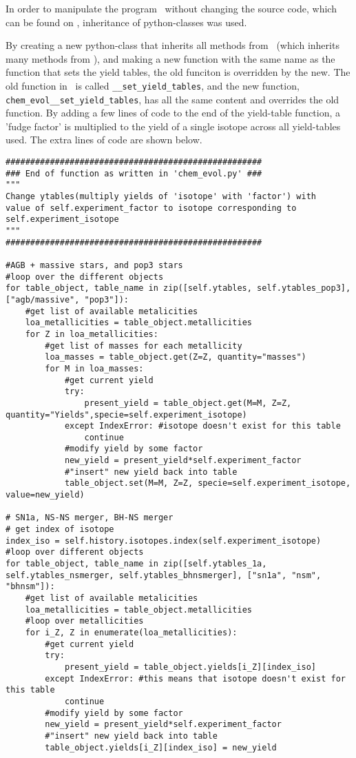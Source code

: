
In order to manipulate the program \omegamodel\ without changing the source code, which can be found on , inheritance of python-classes was used.

By creating a new python-class that inherits all methods from \omegamodel\ (which inherits many methods from \chemevol ), and making a new function with the same name as the function that sets the yield tables, the old funciton is overridden by the new.
The old function in \chemevol\ is called \verb|__set_yield_tables|, and the new function, \verb|chem_evol__set_yield_tables|, has all the same content and overrides the old function. By adding a few lines of code to the end of the yield-table function, a 'fudge factor' is multiplied to the yield of a single isotope across all yield-tables used.
The extra lines of code are shown below.

\begin{lstlisting}[style=custompython, caption={Some caption}]
####################################################
### End of function as written in 'chem_evol.py' ###
""" 
Change ytables(multiply yields of 'isotope' with 'factor') with
value of self.experiment_factor to isotope corresponding to self.experiment_isotope
"""
####################################################

#AGB + massive stars, and pop3 stars
#loop over the different objects
for table_object, table_name in zip([self.ytables, self.ytables_pop3], ["agb/massive", "pop3"]):
    #get list of available metalicities
    loa_metallicities = table_object.metallicities
    for Z in loa_metallicities:
        #get list of masses for each metallicity
        loa_masses = table_object.get(Z=Z, quantity="masses")
        for M in loa_masses:
            #get current yield
            try:
                present_yield = table_object.get(M=M, Z=Z, quantity="Yields",specie=self.experiment_isotope)
            except IndexError: #isotope doesn't exist for this table
                continue
            #modify yield by some factor
            new_yield = present_yield*self.experiment_factor
            #"insert" new yield back into table
            table_object.set(M=M, Z=Z, specie=self.experiment_isotope, value=new_yield)

# SN1a, NS-NS merger, BH-NS merger
# get index of isotope
index_iso = self.history.isotopes.index(self.experiment_isotope)
#loop over different objects
for table_object, table_name in zip([self.ytables_1a, self.ytables_nsmerger, self.ytables_bhnsmerger], ["sn1a", "nsm", "bhnsm"]):
    #get list of available metalicities
    loa_metallicities = table_object.metallicities
    #loop over metallicities
    for i_Z, Z in enumerate(loa_metallicities):
        #get current yield
        try:
            present_yield = table_object.yields[i_Z][index_iso]
        except IndexError: #this means that isotope doesn't exist for this table
            continue
        #modify yield by some factor
        new_yield = present_yield*self.experiment_factor
        #"insert" new yield back into table
        table_object.yields[i_Z][index_iso] = new_yield
\end{lstlisting}
